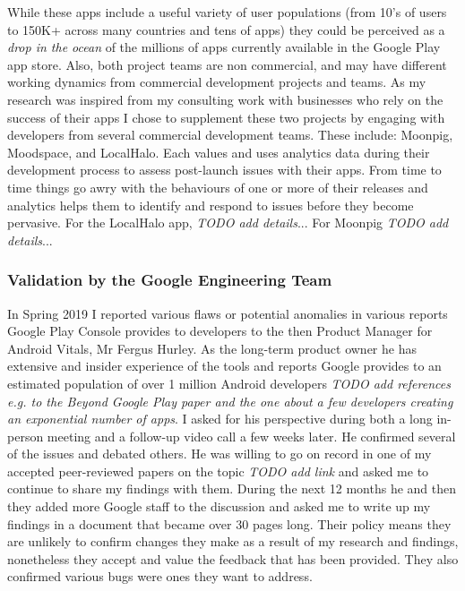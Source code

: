 While these apps include a useful variety of user populations (from 10's of users to 150K+ across many countries and tens of apps) they could be perceived as a \emph{drop in the ocean} of the millions of apps currently available in the Google Play app store. Also, both project teams are non commercial, and may have different working dynamics from commercial development projects and teams. As my research was inspired from my consulting work with businesses who rely on the success of their apps I chose to supplement these two projects by engaging with developers from several commercial development teams. These include: Moonpig, Moodspace, and LocalHalo. Each values and uses analytics data during their development process to assess post-launch issues with their apps. From time to time things go awry with the behaviours of one or more of their releases and analytics helps them to identify and respond to issues before they become pervasive. For the LocalHalo app, \emph{TODO add details}... For Moonpig \emph{TODO add details}...

\subsubsection{Validation by the Google Engineering Team}
In Spring 2019 I reported various flaws or potential anomalies in various reports Google Play Console provides to developers to the then Product Manager for Android Vitals, Mr Fergus Hurley. As the long-term product owner he has extensive and insider experience of the tools and reports Google provides to an estimated population of over 1 million Android developers \emph{TODO add references e.g. to the Beyond Google Play paper and the one about a few developers creating an exponential number of apps}. I asked for his perspective during both a long in-person meeting and a follow-up video call a few weeks later. He confirmed several of the issues and debated others. He was willing to go on record in one of my accepted peer-reviewed papers on the topic \emph{TODO add link} and asked me to continue to share my findings with them. During the next 12 months he and then they added more Google staff to the discussion and asked me to write up my findings in a document that became over 30 pages long. Their policy means they are unlikely to confirm changes they make as a result of my research and findings, nonetheless they accept and value the feedback that has been provided. They also confirmed various bugs were ones they want to address.
